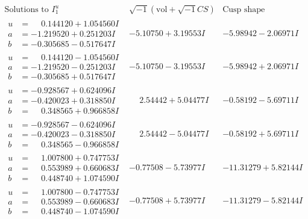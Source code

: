 \documentclass[1p]{elsarticle_modified}
\theoremstyle{definition}
\newcommand{\I}{\sqrt{-1}}
\begin{document}
$$\begin{array}{c|c|c}  
\text{Solutions to }I^u_{1}& \I (\text{vol} + \sqrt{-1}CS) & \text{Cusp shape}\\
 \hline 
\begin{aligned}
u &= \phantom{-}0.144120 + 1.054560 I \\
a &= -1.219520 + 0.251203 I \\
b &= -0.305685 - 0.517647 I\end{aligned}
 & -5.10750 + 3.19553 I & -5.98942 - 2.06971 I \\ \hline\begin{aligned}
u &= \phantom{-}0.144120 - 1.054560 I \\
a &= -1.219520 - 0.251203 I \\
b &= -0.305685 + 0.517647 I\end{aligned}
 & -5.10750 - 3.19553 I & -5.98942 + 2.06971 I \\ \hline\begin{aligned}
u &= -0.928567 + 0.624096 I \\
a &= -0.420023 + 0.318850 I \\
b &= \phantom{-}0.348565 + 0.966858 I\end{aligned}
 & \phantom{-}2.54442 + 5.04477 I & -0.58192 - 5.69711 I \\ \hline\begin{aligned}
u &= -0.928567 - 0.624096 I \\
a &= -0.420023 - 0.318850 I \\
b &= \phantom{-}0.348565 - 0.966858 I\end{aligned}
 & \phantom{-}2.54442 - 5.04477 I & -0.58192 + 5.69711 I \\ \hline\begin{aligned}
u &= \phantom{-}1.007800 + 0.747753 I \\
a &= \phantom{-}0.553989 + 0.660683 I \\
b &= \phantom{-}0.448740 + 1.074590 I\end{aligned}
 & -0.77508 - 5.73977 I & -11.31279 + 5.82144 I \\ \hline\begin{aligned}
u &= \phantom{-}1.007800 - 0.747753 I \\
a &= \phantom{-}0.553989 - 0.660683 I \\
b &= \phantom{-}0.448740 - 1.074590 I\end{aligned}
 & -0.77508 + 5.73977 I & -11.31279 - 5.82144 I \\ \hline\begin{aligned}

\end{aligned}
\end{array}$$
\end{document}
